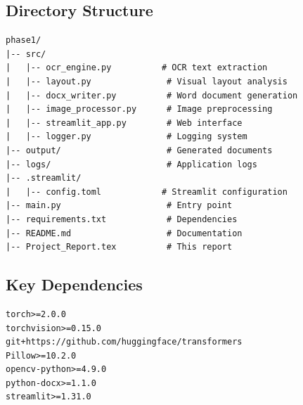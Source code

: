 \documentclass[12pt,a4paper]{article}
\begin{document}
\subsection*{Directory Structure}
\begin{lstlisting}
phase1/
|-- src/
|   |-- ocr_engine.py          # OCR text extraction
|   |-- layout.py               # Visual layout analysis
|   |-- docx_writer.py          # Word document generation
|   |-- image_processor.py      # Image preprocessing
|   |-- streamlit_app.py        # Web interface
|   |-- logger.py               # Logging system
|-- output/                     # Generated documents
|-- logs/                       # Application logs
|-- .streamlit/
|   |-- config.toml            # Streamlit configuration
|-- main.py                     # Entry point
|-- requirements.txt            # Dependencies
|-- README.md                   # Documentation
|-- Project_Report.tex          # This report
\end{lstlisting}

\subsection*{Key Dependencies}
\begin{lstlisting}
torch>=2.0.0
torchvision>=0.15.0
git+https://github.com/huggingface/transformers
Pillow>=10.2.0
opencv-python>=4.9.0
python-docx>=1.1.0
streamlit>=1.31.0
\end{lstlisting}
\end{document}
